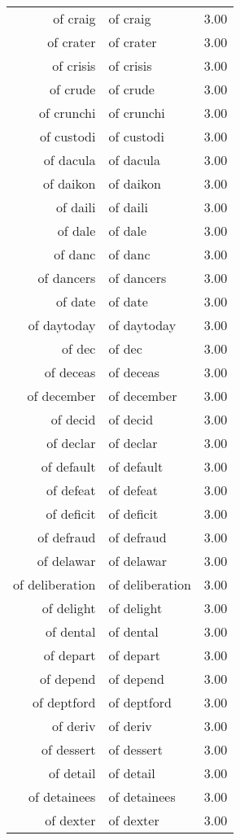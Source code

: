 \begin{table}[ht]
\begin{tabular}{rlr}
  of craig & of craig & 3.00 \\ 
  of crater & of crater & 3.00 \\ 
  of crisis & of crisis & 3.00 \\ 
  of crude & of crude & 3.00 \\ 
  of crunchi & of crunchi & 3.00 \\ 
  of custodi & of custodi & 3.00 \\ 
  of dacula & of dacula & 3.00 \\ 
  of daikon & of daikon & 3.00 \\ 
  of daili & of daili & 3.00 \\ 
  of dale & of dale & 3.00 \\ 
  of danc & of danc & 3.00 \\ 
  of dancers & of dancers & 3.00 \\ 
  of date & of date & 3.00 \\ 
  of daytoday & of daytoday & 3.00 \\ 
  of dec & of dec & 3.00 \\ 
  of deceas & of deceas & 3.00 \\ 
  of december & of december & 3.00 \\ 
  of decid & of decid & 3.00 \\ 
  of declar & of declar & 3.00 \\ 
  of default & of default & 3.00 \\ 
  of defeat & of defeat & 3.00 \\ 
  of deficit & of deficit & 3.00 \\ 
  of defraud & of defraud & 3.00 \\ 
  of delawar & of delawar & 3.00 \\ 
  of deliberation & of deliberation & 3.00 \\ 
  of delight & of delight & 3.00 \\ 
  of dental & of dental & 3.00 \\ 
  of depart & of depart & 3.00 \\ 
  of depend & of depend & 3.00 \\ 
  of deptford & of deptford & 3.00 \\ 
  of deriv & of deriv & 3.00 \\ 
  of dessert & of dessert & 3.00 \\ 
  of detail & of detail & 3.00 \\ 
  of detainees & of detainees & 3.00 \\ 
  of dexter & of dexter & 3.00 \\ 

\end{tabular}
\end{table}
